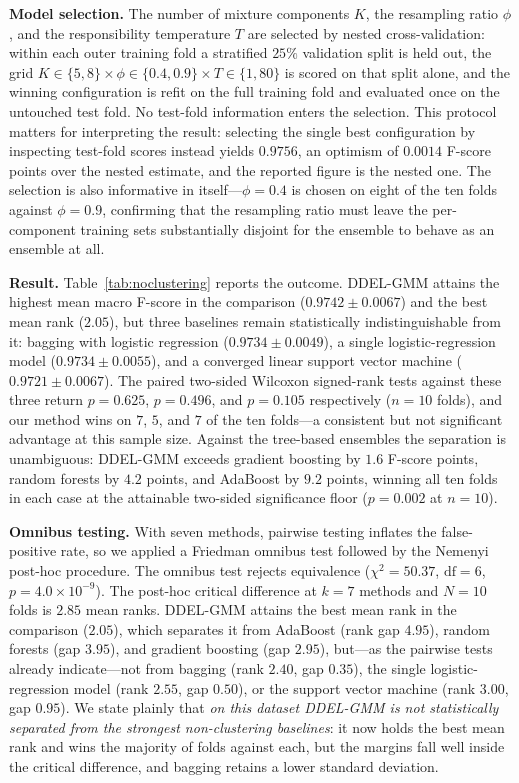 \documentclass[lettersize,journal]{IEEEtran}
\begin{document}
		\noindent \textbf{Model selection.} The number of mixture components $K$, the resampling ratio $\phi$, and the responsibility temperature $T$ are selected by nested cross-validation: within each outer training fold a stratified $25\%$ validation split is held out, the grid $K \in \{5,8\} \times \phi \in \{0.4,0.9\} \times T \in \{1,80\}$ is scored on that split alone, and the winning configuration is refit on the full training fold and evaluated once on the untouched test fold. No test-fold information enters the selection. This protocol matters for interpreting the result: selecting the single best configuration by inspecting test-fold scores instead yields $0.9756$, an optimism of $0.0014$ F-score points over the nested estimate, and the reported figure is the nested one. The selection is also informative in itself---$\phi = 0.4$ is chosen on eight of the ten folds against $\phi = 0.9$, confirming that the resampling ratio must leave the per-component training sets substantially disjoint for the ensemble to behave as an ensemble at all.
		
		\noindent \textbf{Result.} Table~\ref{tab:noclustering} reports the outcome. DDEL-GMM attains the highest mean macro F-score in the comparison ($0.9742 \pm 0.0067$) and the best mean rank ($2.05$), but three baselines remain statistically indistinguishable from it: bagging with logistic regression ($0.9734 \pm 0.0049$), a single logistic-regression model ($0.9734 \pm 0.0055$), and a converged linear support vector machine ($0.9721 \pm 0.0067$). The paired two-sided Wilcoxon signed-rank tests against these three return $p = 0.625$, $p = 0.496$, and $p = 0.105$ respectively ($n = 10$ folds), and our method wins on $7$, $5$, and $7$ of the ten folds---a consistent but not significant advantage at this sample size. Against the tree-based ensembles the separation is unambiguous: DDEL-GMM exceeds gradient boosting by $1.6$ F-score points, random forests by $4.2$ points, and AdaBoost by $9.2$ points, winning all ten folds in each case at the attainable two-sided significance floor ($p = 0.002$ at $n = 10$).
		
		\noindent \textbf{Omnibus testing.} With seven methods, pairwise testing inflates the false-positive rate, so we applied a Friedman omnibus test followed by the Nemenyi post-hoc procedure. The omnibus test rejects equivalence ($\chi^2 = 50.37$, $\mathrm{df} = 6$, $p = 4.0 \times 10^{-9}$). The post-hoc critical difference at $k = 7$ methods and $N = 10$ folds is $2.85$ mean ranks. DDEL-GMM attains the best mean rank in the comparison ($2.05$), which separates it from AdaBoost (rank gap $4.95$), random forests (gap $3.95$), and gradient boosting (gap $2.95$), but---as the pairwise tests already indicate---not from bagging (rank $2.40$, gap $0.35$), the single logistic-regression model (rank $2.55$, gap $0.50$), or the support vector machine (rank $3.00$, gap $0.95$). We state plainly that \emph{on this dataset DDEL-GMM is not statistically separated from the strongest non-clustering baselines}: it now holds the best mean rank and wins the majority of folds against each, but the margins fall well inside the critical difference, and bagging retains a lower standard deviation.
		
\end{document}
